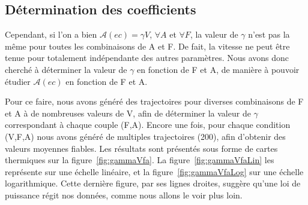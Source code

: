 	\subsection{Détermination des coefficients}
	Cependant, si l'on a bien $\mathcal{A}(ec) = \gamma{}V$, $\forall A$ et $\forall F$, la valeur de $\gamma$ n'est pas la même pour toutes les combinaisons de A et F. De fait, la vitesse ne peut être tenue pour totalement indépendante des autres paramètres. Nous avons donc cherché à déterminer la valeur de $\gamma$ en fonction de F et A, de manière à pouvoir étudier $\mathcal{A}(ec)$ en fonction de F et A.
	
	Pour ce faire, nous avons généré des trajectoires pour diverses combinaisons de F et A à de nombreuses valeurs de V, afin de déterminer la valeur de $\gamma$ correspondant à chaque couple (F,A). Encore une fois, pour chaque condition (V,F,A) nous avons généré de multiples trajectoires (200), afin d'obtenir des valeurs moyennes fiables. Les résultats sont présentés sous forme de cartes thermiques sur la figure~\ref{fig:gammaVfa}. La figure~\ref{fig:gammaVfaLin} les représente sur une échelle linéaire, et la figure~\ref{fig:gammaVfaLog} sur une échelle logarithmique. Cette dernière figure, par ses lignes droites, suggère qu'une loi de puissance régit nos données, comme nous allons le voir plus loin.
	
